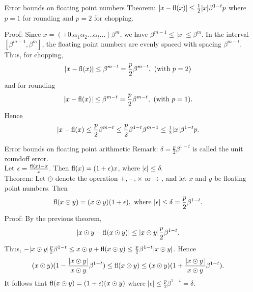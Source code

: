 \documentclass{beamer}
\begin{document}
\begin{frame}{Error bounds on floating point numbers}
Theorem: $|x - \text{fl}(x)| \leq \tfrac{1}{2} |x| \beta^{1-t} p$
where $p=1$ for rounding and $p=2$ for chopping.

Proof: Since $x = (\pm 0.\alpha_1 \alpha_2 \ldots \alpha_t \ldots) \beta^m$, we have
$\beta^{m-1} \leq |x| \leq \beta^m$. In the interval $[\beta^{m-1}, \beta^m]$, the floating point numbers
are evenly spaced with spacing $\beta^{m - t}$. Thus, for chopping,
\begin{equation*}
|x - \text{fl}(x)| \leq \beta^{m - t} = \frac{p}{2} \beta^{m-t}, \text{ (with $p = 2$)}
\end{equation*}
and for rounding
\begin{equation*}
|x - \text{fl}(x)| \leq \beta^{m - t} = \frac{p}{2} \beta^{m-t}, \text{ (with $p = 1$)}.
\end{equation*}
Hence
\begin{equation*}
|x - \text{fl}(x) \leq \frac{p}{2} \beta^{m - t} \leq \frac{p}{2} \beta^{1-t} \beta^{m-1} \leq \tfrac{1}{2} |x| \beta^{1-t} p.
\end{equation*}
\end{frame}

\begin{frame}{Error bounds on floating point arithmetic}
Remark: $\delta = \frac{p}{2} \beta^{1-t}$ is called the unit roundoff error.\\
Let $\epsilon = \frac{\text{fl}(x) - x}{x}$. Then $\text{fl}(x) = (1 + \epsilon) x$, where $|\epsilon| \leq \delta$.\\
Theorem: Let $\odot$ denote the operation $+, -, \times \text{ or } \div$, and let $x$ and $y$ be
floating point numbers. Then
\begin{equation*}
\text{fl}(x \odot y) = (x \odot y)(1 + \epsilon), \text{ where } |\epsilon| \leq \delta = \frac{p}{2} \beta^{1-t}.
\end{equation*}
Proof: By the previous theorem,
\begin{equation*}
|x \odot y - \text{fl}(x \odot y)| \leq |x \odot y| \frac{p}{2} \beta^{1-t}.
\end{equation*}
Thus, $-|x \odot y| \frac{p}{2} \beta^{1 - t} \leq x \odot y + \text{fl}(x \odot y) \leq \frac{p}{2} \beta^{1 - t} |x \odot y|$.
Hence
\begin{equation*}
(x \odot y)(1 - \frac{|x \odot y|}{x \odot y} \beta^{1-t}) \leq \text{fl}(x \odot y) \leq (x \odot y)(1 + \frac{|x \odot y|}{x \odot y} \beta^{1-t}).
\end{equation*}
It follows that $\text{fl}(x \odot y) = (1 + \epsilon) (x \odot y)$ where
$|\epsilon| \leq \frac{p}{2} \beta^{1-t} = \delta$.
\end{frame}
\end{document}
